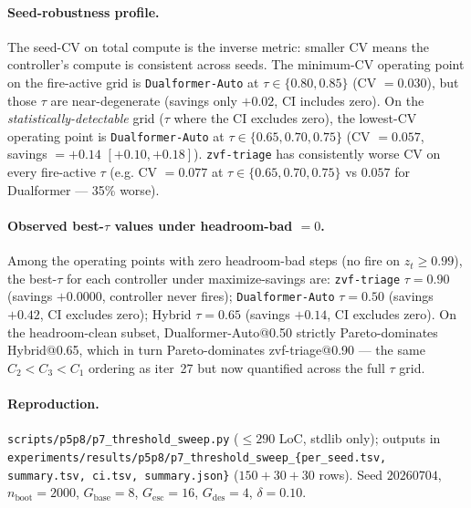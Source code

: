 \paragraph{Seed-robustness profile.}
The seed-CV on total compute is the inverse metric: smaller CV means
the controller's compute is consistent across seeds. The minimum-CV
operating point on the fire-active grid is \texttt{Dualformer-Auto}
at $\tau \in \{0.80, 0.85\}$ (CV $= 0.030$), but those $\tau$ are
near-degenerate (savings only $+0.02$, CI includes zero). On the
\emph{statistically-detectable} grid ($\tau$ where the CI excludes
zero), the lowest-CV operating point is
\texttt{Dualformer-Auto} at $\tau \in \{0.65, 0.70, 0.75\}$
(CV $= 0.057$, savings $= +0.14$ $[+0.10, +0.18]$). \texttt{zvf-triage}
has consistently worse CV on every fire-active $\tau$ (e.g. CV $= 0.077$
at $\tau \in \{0.65, 0.70, 0.75\}$ vs $0.057$ for Dualformer --- 35\%
worse).

\paragraph{Observed best-$\tau$ values under headroom-bad $= 0$.}
Among the operating points with zero headroom-bad steps (no fire on
$z_t \geq 0.99$), the best-$\tau$ for each controller under
maximize-savings are: \texttt{zvf-triage} $\tau{=}0.90$ (savings
$+0.0000$, controller never fires); \texttt{Dualformer-Auto}
$\tau{=}0.50$ (savings $+0.42$, CI excludes zero); Hybrid $\tau{=}0.65$
(savings $+0.14$, CI excludes zero). On the headroom-clean subset,
Dualformer-Auto@0.50 strictly Pareto-dominates Hybrid@0.65, which in
turn Pareto-dominates zvf-triage@0.90 --- the same $C_2 < C_3 < C_1$
ordering as iter~27 but now quantified across the full $\tau$ grid.

\paragraph{Reproduction.}
\texttt{scripts/p5p8/p7\_threshold\_sweep.py} ($\leq 290$ LoC,
stdlib only); outputs in
\texttt{experiments/results/p5p8/p7\_threshold\_sweep\_\{per\_seed.tsv,
summary.tsv, ci.tsv, summary.json\}} ($150 + 30 + 30$ rows). Seed
$20260704$, $n_{\mathrm{boot}}{=}2000$, $G_{\mathrm{base}}{=}8$,
$G_{\mathrm{esc}}{=}16$, $G_{\mathrm{des}}{=}4$, $\delta{=}0.10$.

